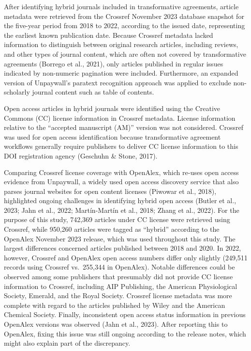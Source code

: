 \documentclass[a4paper,man,floatsintext,longtable,noextraspace,12pt]{apa6}
\begin{document}
After identifying hybrid journals included in transformative agreements,
article metadata were retrieved from the Crossref November 2023 database
snapshot for the five-year period from 2018 to 2022, according to the
issued date, representing the earliest known publication date. Because
Crossref metadata lacked information to distinguish between original
research articles, including reviews, and other types of journal
content, which are often not covered by transformative agreements
(Borrego et al., 2021), only articles published in regular issues
indicated by non-numeric pagination were included. Furthermore, an
expanded version of Unpaywall's paratext recognition approach was
applied to exclude non-scholarly journal content such as table of
contents.

Open access articles in hybrid journals were identified using the
Creative Commons (CC) license information in Crossref metadata. License
information relative to the ``accepted manuscript (AM)'' version was not
considered. Crossref was used for open access identification because
transformative agreement workflows generally require publishers to
deliver CC license information to this DOI registration agency (Geschuhn
\& Stone, 2017).

Comparing Crossref license coverage with OpenAlex, which re-uses open
access evidence from Unpaywall, a widely used open access discovery
service that also parses journal websites for open content licenses
(Piwowar et al., 2018), highlighted ongoing challenges in identifying
hybrid open access (Butler et al., 2023; Jahn et al., 2022;
Martín-Martín et al., 2018; Zhang et al., 2022). For the purpose of this
study, 742,369 articles under CC license were retrieved using Crossref,
while 950,260 articles were tagged as ``hybrid'' according to the
OpenAlex November 2023 release, which was used throughout this study.
The largest differences concerned articles published between 2018 and
2020. In 2022, however, Crossref and OpenAlex open access numbers differ
only slightly (249,511 records using Crossref vs.~255,344 in OpenAlex).
Notable differences could be observed among some publishers that
presumably did not provide CC license information to Crossref, including
AIP Publishing, the American Physiological Society, Emerald, and the
Royal Society. Crossref license metadata was more complete with regard
to the articles published by Wiley and the American Chemical Society.
Finally, inconsistent open access status information in previous
OpenAlex versions was observed (Jahn et al., 2023). After reporting this
to OpenAlex, fixing this issue was still ongoing according to the
release notes, which might also explain part of the discrepancy.
\end{document}
